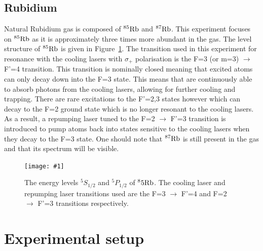 \documentclass[twocolumn]{article}
\newcommand{\insertFigure}[1]{%
   \texttt{[image: \#1]}%
}
\begin{document}
\subsection{Rubidium} \label{sec:Rubidium}
Natural Rubidium gas is composed of $^{85}\ce{Rb}$ and $^{87}\ce{Rb}$. This experiment focuses on $^{85}\ce{Rb}$ as it is approximately three times more abundant in the gas. The level structure of $^{85}\ce{Rb}$ is given in Figure~\ref{fig:Spectrum}. The transition used in this experiment for resonance with the cooling lasers with $\sigma_+$ polarisation is the F=3 (or m=3) $\to$ F'=4 transition. This transition is nominally closed meaning that excited atoms can only decay down into the F=3 state. This means that are continuously able to absorb photons from the cooling lasers, allowing for further cooling and trapping. There are rare excitations to the F'=2,3 states however which can decay to the F=2 ground state which is no longer resonant to the cooling lasers. As a result, a repumping laser tuned to the F=2 $\to$ F'=3 transition is introduced to pump atoms back into states sensitive to the cooling lasers when they decay to the F=3 state. One should note that $^{87}\ce{Rb}$ is still present in the gas and that its spectrum will be visible.
\begin{figure} [!h]
	\centering
	\insertFigure{Images/Spectrum.png}
	\caption{The energy levels $^5S_{1/2}$ and $^5P_{1/2}$ of $^85\ce{Rb}$. The cooling laser and repumping laser transitions used are the F=3 $\to$ F'=4 and F=2 $\to$ F'=3 transitions respectively.~\cite{Wieman}}
	\label{fig:Spectrum}
\end{figure}

\section{Experimental setup} \label{sec:Exp}
\end{document}
